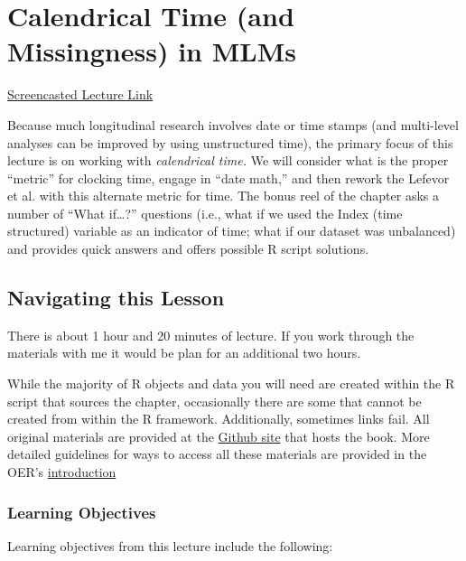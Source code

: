 \documentclass[
  11pt,
]{book}
\begin{document}
\hypertarget{TimeLord}{%
\chapter{Calendrical Time (and Missingness) in MLMs}\label{TimeLord}}

\href{https://spu.hosted.panopto.com/Panopto/Pages/Viewer.aspx?pid=5ea38416-c682-49f8-ba71-ad390025e36e}{Screencasted Lecture Link}

Because much longitudinal research involves date or time stamps (and multi-level analyses can be improved by using unstructured time), the primary focus of this lecture is on working with \emph{calendrical time.} We will consider what is the proper ``metric'' for clocking time, engage in ``date math,'' and then rework the Lefevor et al.\citeyearpar{lefevor_religious_2017} with this alternate metric for time. The bonus reel of the chapter asks a number of ``What if\ldots?'' questions (i.e., what if we used the Index (time structured) variable as an indicator of time; what if our dataset was unbalanced) and provides quick answers and offers possible R script solutions.

\hypertarget{navigating-this-lesson-3}{%
\section{Navigating this Lesson}\label{navigating-this-lesson-3}}

There is about 1 hour and 20 minutes of lecture. If you work through the materials with me it would be plan for an additional two hours.

While the majority of R objects and data you will need are created within the R script that sources the chapter, occasionally there are some that cannot be created from within the R framework. Additionally, sometimes links fail. All original materials are provided at the \href{https://github.com/lhbikos/ReC_CPA}{Github site} that hosts the book. More detailed guidelines for ways to access all these materials are provided in the OER's \protect\hyperlink{ReCintro}{introduction}

\hypertarget{learning-objectives-3}{%
\subsection{Learning Objectives}\label{learning-objectives-3}}

Learning objectives from this lecture include the following:
\end{document}
